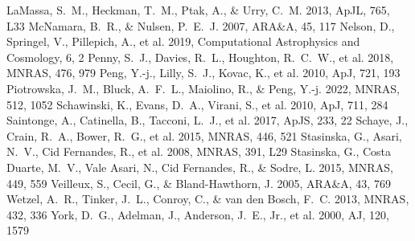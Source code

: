 \documentclass[twocolumn]{aastex631}
\begin{document}
\begin{thebibliography}{}
 LaMassa, S.~M., Heckman, T.~M., Ptak, A., \& Urry, C.~M. 2013, ApJL, 765, L33
 McNamara, B.~R., \& Nulsen, P.~E.~J. 2007, ARA\&A, 45, 117
 Nelson, D., Springel, V., Pillepich, A., et al. 2019, Computational Astrophysics and Cosmology, 6, 2
 Penny, S.~J., Davies, R.~L., Houghton, R.~C.~W., et al. 2018, MNRAS, 476, 979
 Peng, Y.-j., Lilly, S.~J., Kovac, K., et al. 2010, ApJ, 721, 193
 Piotrowska, J.~M., Bluck, A.~F.~L., Maiolino, R., \& Peng, Y.-j. 2022, MNRAS, 512, 1052
 Schawinski, K., Evans, D.~A., Virani, S., et al. 2010, ApJ, 711, 284
 Saintonge, A., Catinella, B., Tacconi, L.~J., et al. 2017, ApJS, 233, 22
 Schaye, J., Crain, R.~A., Bower, R.~G., et al. 2015, MNRAS, 446, 521
 Stasinska, G., Asari, N.~V., Cid Fernandes, R., et al. 2008, MNRAS, 391, L29
 Stasinska, G., Costa Duarte, M.~V., Vale Asari, N., Cid Fernandes, R., \& Sodre, L. 2015, MNRAS, 449, 559
 Veilleux, S., Cecil, G., \& Bland-Hawthorn, J. 2005, ARA\&A, 43, 769
 Wetzel, A.~R., Tinker, J.~L., Conroy, C., \& van den Bosch, F.~C. 2013, MNRAS, 432, 336
 York, D.~G., Adelman, J., Anderson, J.~E., Jr., et al. 2000, AJ, 120, 1579
\end{thebibliography}
\end{document}
